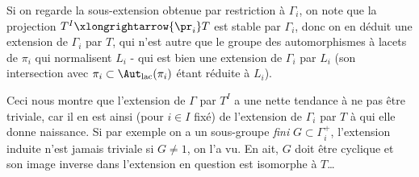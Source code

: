 Si on regarde la sous-extension obtenue par restriction à $\Gamma_i$, on note que la projection $T^I \xlongrightarrow{\pr_i} T$ est stable par $\Gamma_i$, donc on en déduit  une extension de $\Gamma_i$ par $T$, qui n'est autre que le groupe des automorphismes à lacets de $\pi_i$ qui normalisent $L_i$ - qui est bien une extension de $\Gamma_i$ par $L_i$ (son intersection avec $\pi_i \subset  \Aut_{\text{lac}}(\pi_i)$ étant réduite à $L_i$).

Ceci nous montre que l'extension de $\Gamma$ par $T^I$ a une nette tendance à ne pas être triviale, car il en est ainsi (pour $i \in I$ fixé) de l'extension de $\Gamma_i$ par $T$ à qui elle donne naissance. Si par exemple on a un sous-groupe \emph{fini} $G \subset  \Gamma^+_i$, l'extension induite n'est jamais triviale si $G \neq 1$, on l'a vu. En ait, $G$ doit être cyclique et son image inverse dans l'extension en question est isomorphe à $T$\dots


